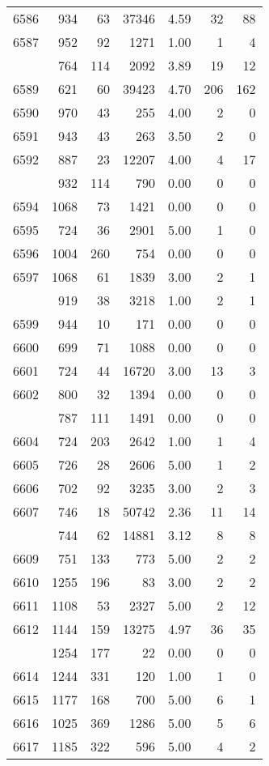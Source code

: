 \documentclass[
]{article}
\begin{document}
\begin{table}
\begin{tabular}[t]{lrrrrrr}
6586 & 934 & 63 & 37346 & 4.59 & 32 & 88\\
6587 & 952 & 92 & 1271 & 1.00 & 1 & 4\\
\addlinespace
6588 & 764 & 114 & 2092 & 3.89 & 19 & 12\\
6589 & 621 & 60 & 39423 & 4.70 & 206 & 162\\
6590 & 970 & 43 & 255 & 4.00 & 2 & 0\\
6591 & 943 & 43 & 263 & 3.50 & 2 & 0\\
6592 & 887 & 23 & 12207 & 4.00 & 4 & 17\\
\addlinespace
6593 & 932 & 114 & 790 & 0.00 & 0 & 0\\
6594 & 1068 & 73 & 1421 & 0.00 & 0 & 0\\
6595 & 724 & 36 & 2901 & 5.00 & 1 & 0\\
6596 & 1004 & 260 & 754 & 0.00 & 0 & 0\\
6597 & 1068 & 61 & 1839 & 3.00 & 2 & 1\\
\addlinespace
6598 & 919 & 38 & 3218 & 1.00 & 2 & 1\\
6599 & 944 & 10 & 171 & 0.00 & 0 & 0\\
6600 & 699 & 71 & 1088 & 0.00 & 0 & 0\\
6601 & 724 & 44 & 16720 & 3.00 & 13 & 3\\
6602 & 800 & 32 & 1394 & 0.00 & 0 & 0\\
\addlinespace
6603 & 787 & 111 & 1491 & 0.00 & 0 & 0\\
6604 & 724 & 203 & 2642 & 1.00 & 1 & 4\\
6605 & 726 & 28 & 2606 & 5.00 & 1 & 2\\
6606 & 702 & 92 & 3235 & 3.00 & 2 & 3\\
6607 & 746 & 18 & 50742 & 2.36 & 11 & 14\\
\addlinespace
6608 & 744 & 62 & 14881 & 3.12 & 8 & 8\\
6609 & 751 & 133 & 773 & 5.00 & 2 & 2\\
6610 & 1255 & 196 & 83 & 3.00 & 2 & 2\\
6611 & 1108 & 53 & 2327 & 5.00 & 2 & 12\\
6612 & 1144 & 159 & 13275 & 4.97 & 36 & 35\\
\addlinespace
6613 & 1254 & 177 & 22 & 0.00 & 0 & 0\\
6614 & 1244 & 331 & 120 & 1.00 & 1 & 0\\
6615 & 1177 & 168 & 700 & 5.00 & 6 & 1\\
6616 & 1025 & 369 & 1286 & 5.00 & 5 & 6\\
6617 & 1185 & 322 & 596 & 5.00 & 4 & 2\\

\end{tabular}
\end{table}
\end{document}
